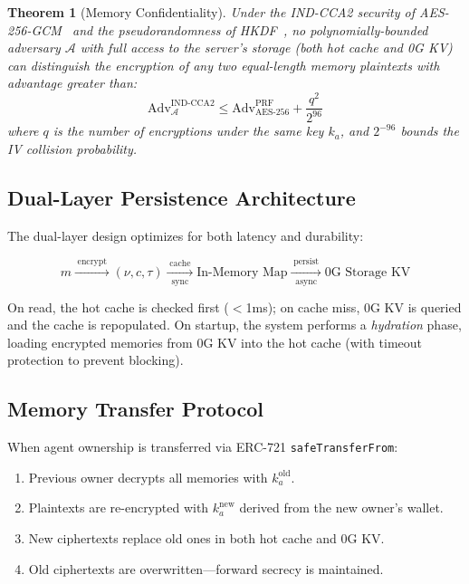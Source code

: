 \documentclass[10pt,a4paper]{article}
\theoremstyle{definition}
\theoremstyle{plain}
\newtheorem{theorem}{Theorem}[section]
\begin{document}
\begin{theorem}[Memory Confidentiality]\label{thm:memory}
Under the IND-CCA2 security of AES-256-GCM~\cite{nist-gcm, aes2001} and the pseudorandomness of HKDF~\cite{rfc5869}, no polynomially-bounded adversary $\mathcal{A}$ with full access to the server's storage (both hot cache and 0G KV) can distinguish the encryption of any two equal-length memory plaintexts with advantage greater than:
$$\text{Adv}^{\text{IND-CCA2}}_{\mathcal{A}} \leq \text{Adv}^{\text{PRF}}_{\text{AES-256}} + \frac{q^2}{2^{96}}$$
where $q$ is the number of encryptions under the same key $k_a$, and $2^{-96}$ bounds the IV collision probability.
\end{theorem}

\subsection{Dual-Layer Persistence Architecture}

The dual-layer design optimizes for both latency and durability:

$$m \xrightarrow{\;\text{encrypt}\;} (\nu, c, \tau) \xrightarrow[\text{sync}]{\;\text{cache}\;} \text{In-Memory Map} \xrightarrow[\text{async}]{\;\text{persist}\;} \text{0G Storage KV}$$

\noindent On read, the hot cache is checked first ($<$1ms); on cache miss, 0G KV is queried and the cache is repopulated. On startup, the system performs a \emph{hydration} phase, loading encrypted memories from 0G KV into the hot cache (with timeout protection to prevent blocking).

\subsection{Memory Transfer Protocol}

When agent ownership is transferred via ERC-721 \texttt{safeTransferFrom}:
\begin{enumerate}[leftmargin=1.8em, itemsep=2pt, parsep=0pt]
  \item Previous owner decrypts all memories with $k_a^{\text{old}}$.
  \item Plaintexts are re-encrypted with $k_a^{\text{new}}$ derived from the new owner's wallet.
  \item New ciphertexts replace old ones in both hot cache and 0G KV.
  \item Old ciphertexts are overwritten---forward secrecy is maintained.
\end{enumerate}
\end{document}
